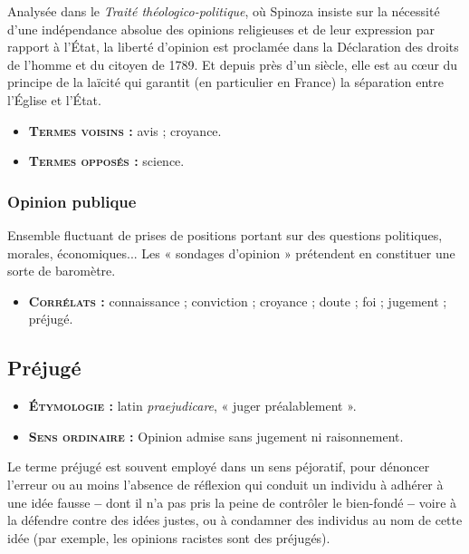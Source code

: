 Analysée dans le {\it Traité
théologico-politique}, où Spinoza insiste
sur la nécessité d'une indépendance
absolue des opinions religieuses et de
leur expression par rapport à l'État, la
liberté d'opinion est proclamée dans la
Déclaration des droits de l'homme et du
citoyen de 1789. Et depuis près d'un
siècle, elle est au cœur du principe de la
laïcité qui garantit (en particulier en
France) la séparation entre l'Église et
l'État.

{\footnotesize
\begin{itemize}[leftmargin=1cm, label=, itemsep=1pt]
\item {\bf \textsc{Termes voisins} :} avis ; croyance.
\item {\bf \textsc{Termes opposés} :} science.
\end{itemize}
}

\subsubsection{Opinion publique}

Ensemble fluctuant de prises de positions
portant sur des questions politiques,
 morales, économiques... Les
« sondages d'opinion » prétendent en
constituer une sorte de baromètre.

{\footnotesize
\begin{itemize}[leftmargin=1cm, label=, itemsep=1pt]
\item {\bf \textsc{Corrélats} :} connaissance ;
conviction ; croyance ; doute ; foi ;
jugement ; préjugé.
\end{itemize}
}

\subsection{Préjugé}

{\footnotesize
\begin{itemize}[leftmargin=1cm, label=, itemsep=1pt]
\item {\bf \textsc{Étymologie} :} latin {\it praejudicare},
« juger préalablement ».
\item {\bf \textsc{Sens ordinaire} :} Opinion admise sans
jugement ni raisonnement.
\end{itemize}
}

Le terme préjugé est souvent employé
dans un sens péjoratif, pour dénoncer
l'erreur ou au moins l'absence de
réflexion qui conduit un individu à
adhérer à une idée fausse {\bf --} dont il n’a
pas pris la peine de contrôler le bien-fondé {\bf --}
voire à la défendre contre des
idées justes, ou à condamner des individus
au nom de cette idée (par
exemple, les opinions racistes sont des
préjugés).

